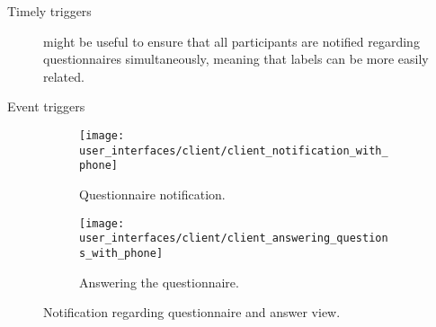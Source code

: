 \begin{description}
   	\item[Timely triggers] might be useful to ensure that all participants are notified regarding questionnaires simultaneously, meaning that labels can be more easily related.

   	\item[Event triggers] 
\end{description}    

\begin{figure}[!htbp]
\begin{subfigure}[!t]{.50\textwidth}
  \centering
  \texttt{[image: user\_interfaces/client/client\_notification\_with\_phone]}
  \caption{Questionnaire notification.}
  \label{fig:answering_questionnaire_notification}
\end{subfigure}%
\begin{subfigure}[!t]{.50\textwidth}
  \centering
  \texttt{[image: user\_interfaces/client/client\_answering\_questions\_with\_phone]}
  \caption{Answering the questionnaire.}
  \label{fig:answering_questionnaire_answering}
\end{subfigure}
\caption{Notification regarding questionnaire and answer view.}
\label{fig:answering_questionnaire}
\end{figure}
\FloatBarrier